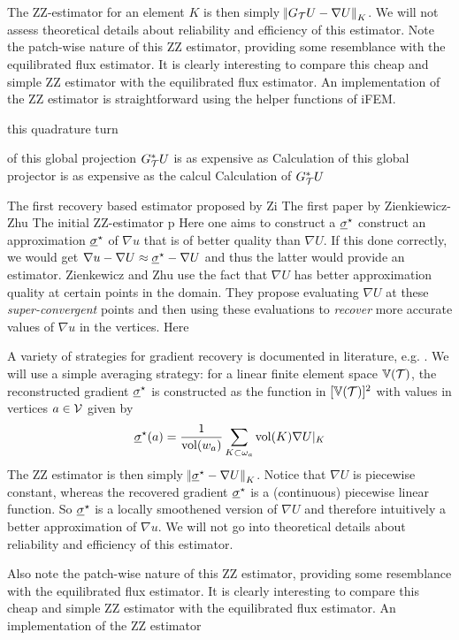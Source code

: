 \documentclass[thesis.tex]{subfiles}
\begin{document}
The ZZ-estimator for an element $K$ is then simply $\norm{G_{\mathcal{T}} U - \nabla U}_K$. We will
not assess theoretical details about reliability and efficiency of this estimator. Note the patch-wise nature of this ZZ estimator,
providing some resemblance with the equilibrated flux estimator.
It is clearly interesting to compare this cheap and simple ZZ estimator with the equilibrated flux estimator.
An implementation of the ZZ estimator is straightforward using the helper functions of iFEM.


this quadrature turn

of this global projection $G_{\mathcal{T}}^*U$ is as expensive as
Calculation of this global projector is as expensive as the calcul
Calculation of $G_{\mathcal{T}}^*U$

The first recovery based estimator proposed by Zi
The first paper by Zienkiewicz-Zhu 
The initial ZZ-estimator p
Here one aims to construct a $\underline{\sigma}^\star$ construct an approximation $\underline{\sigma}^\star$ of $\nabla u$ that is of better quality than $\nabla U$. 
If this done correctly, we would get $\nabla u - \nabla U \approx \underline{\sigma}^\star - \nabla U$ and thus the latter would provide
an estimator. Zienkewicz and Zhu use the fact that $\nabla U$ has better approximation quality
at certain points in the domain. They propose evaluating $\nabla U$ at these \emph{super-convergent} points and then using these
evaluations to \emph{recover} more accurate values of $\nabla u$ in the vertices. Here

A variety of strategies for gradient recovery is documented in literature, e.g. \cite{zienkiewicz1992superconvergent}. 
We will use a simple averaging strategy: for a linear finite element space $\mathbb{V}(\mathcal{T})$, the reconstructed gradient $\underline{\sigma}^\star$ is constructed as
the function in $[\mathbb{V}(\mathcal{T})]^2$ with values in vertices $a \in \mathcal{V}$ given by
\[
  \underline{\sigma}^\star(a) = \frac{1}{\operatorname{vol}(w_a)} \sum_{K \subset \omega_a} \operatorname{vol}(K) \nabla U|_K
\]
The ZZ estimator is then simply $\norm{\underline{\sigma}^\star - \nabla U}_K$. Notice that $\nabla U$ is piecewise constant, whereas
the recovered gradient $\underline{\sigma}^\star$ is a (continuous) piecewise linear function. So $\underline{\sigma}^\star$ is a
locally smoothened version of $\nabla U$ and therefore intuitively a better approximation of $\nabla u$. We will
not go into theoretical details about reliability and efficiency of this estimator.

Also note the patch-wise nature of this ZZ estimator, providing some resemblance with the equilibrated flux estimator.
It is clearly interesting to compare this cheap and simple ZZ estimator with the equilibrated flux estimator. An implementation
of the ZZ estimator 
\end{document}
